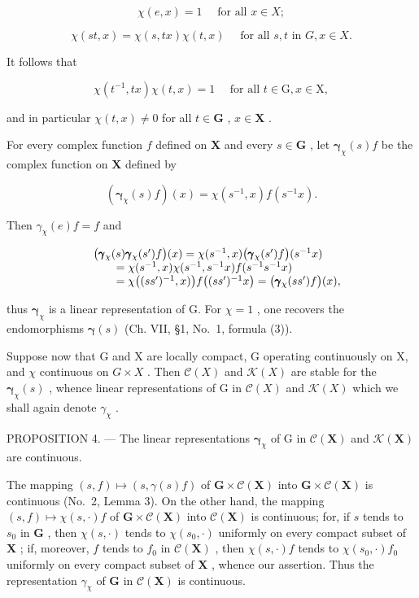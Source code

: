 \[
\chi (e, x) = 1 \quad \text { for   all } x \in X;\tag{2}
\]

\[
\chi (s t, x) = \chi (s, t x) \chi (t, x) \quad \text { for   all } s, t \text { in } G, x \in X.
\]

It follows that

\[
\chi (t ^ {- 1}, t x) \chi (t, x) = 1 \quad \text { for   all } t \in \mathrm{G}, x \in \mathrm{X},\tag{3}
\]

and in particular \(\chi(t, x) \neq 0\) for all \(t \in \mathbf{G}\) , \(x \in \mathbf{X}\) .

For every complex function \(f\) defined on \(\mathbf{X}\) and every \(s \in \mathbf{G}\) , let \(\pmb{\gamma}_{\chi}(s)f\) be the complex function on \(\mathbf{X}\) defined by

\[
\left(\boldsymbol {\gamma} _ {\chi} (s) f\right) (x) = \chi (s ^ {- 1}, x) f (s ^ {- 1} x).\tag{4}
\]

Then \(\gamma_{\chi}(e)f = f\) and

\[
\begin{array}{r l} & {\big (\pmb {\gamma} _ {\chi} (s) \pmb {\gamma} _ {\chi} (s ^ {\prime}) f \big) (x) = \chi (s ^ {- 1}, x) \big (\pmb {\gamma} _ {\chi} (s ^ {\prime}) f \big) (s ^ {- 1} x)} \\ & {\qquad = \chi (s ^ {- 1}, x) \chi (s ^ {- 1}, s ^ {- 1} x) f (s ^ {- 1} s ^ {- 1} x)} \\ & {\qquad = \chi \big ((s s ^ {\prime}) ^ {- 1}, x) \big) f \big ((s s ^ {\prime}) ^ {- 1} x \big) = \big (\pmb {\gamma} _ {\chi} (s s ^ {\prime}) f \big) (x),} \end{array}
\]

thus \(\pmb{\gamma}_{\chi}\) is a linear representation of G. For \(\chi = 1\) , one recovers the endomorphisms \(\pmb{\gamma}(s)\) (Ch. VII, §1, No.~1, formula (3)).

Suppose now that G and X are locally compact, G operating continuously on X, and \(\chi\) continuous on \(G \times X\) . Then \(\mathcal{C}(X)\) and \(\mathcal{K}(X)\) are stable for the \(\boldsymbol{\gamma}_{\chi}(s)\) , whence linear representations of G in \(\mathcal{C}(X)\) and \(\mathcal{K}(X)\) which we shall again denote \(\gamma_{\chi}\) .

PROPOSITION 4. --- The linear representations \(\pmb{\gamma}_{\chi}\) of G in \(\mathcal{C}(\mathbf{X})\) and \(\mathcal{K}(\mathbf{X})\) are continuous.

The mapping \((s, f) \mapsto (s, \gamma(s)f)\) of \(\mathbf{G} \times \mathcal{C}(\mathbf{X})\) into \(\mathbf{G} \times \mathcal{C}(\mathbf{X})\) is continuous (No.~2, Lemma 3). On the other hand, the mapping \((s, f) \mapsto \chi(s, \cdot)f\) of \(\mathbf{G} \times \mathcal{C}(\mathbf{X})\) into \(\mathcal{C}(\mathbf{X})\) is continuous; for, if \(s\) tends to \(s_0\) in \(\mathbf{G}\) , then \(\chi(s, \cdot)\) tends to \(\chi(s_0, \cdot)\) uniformly on every compact subset of \(\mathbf{X}\) ; if, moreover, \(f\) tends to \(f_0\) in \(\mathcal{C}(\mathbf{X})\) , then \(\chi(s, \cdot)f\) tends to \(\chi(s_0, \cdot)f_0\) uniformly on every compact subset of \(\mathbf{X}\) , whence our assertion. Thus the representation \(\gamma_{\chi}\) of \(\mathbf{G}\) in \(\mathcal{C}(\mathbf{X})\) is continuous.


